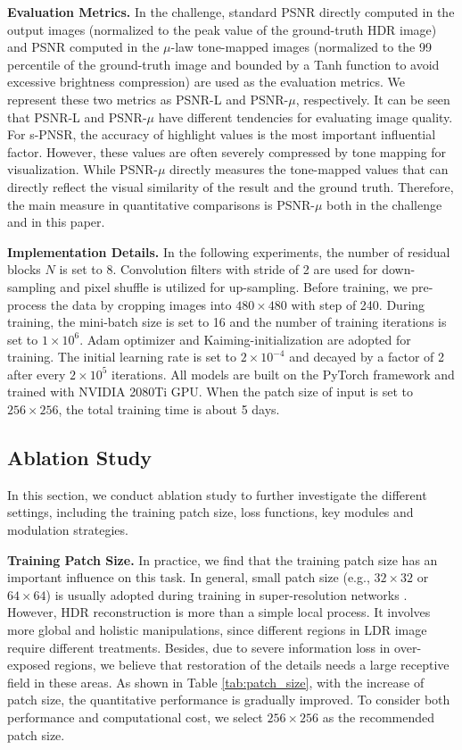 \documentclass[final]{cvpr}
\begin{document}
\textbf{Evaluation Metrics.} In the challenge, standard PSNR directly computed in the output images (normalized to the peak value of the ground-truth HDR image) and PSNR computed in the $\mu$-law tone-mapped images (normalized to the 99 percentile of the ground-truth image and bounded by a Tanh function to avoid excessive brightness compression) are used as the evaluation metrics. We represent these two metrics as PSNR-L and PSNR-$\mu$, respectively. It can be seen that PSNR-L and PSNR-$\mu$ have different tendencies for evaluating image quality. For s-PNSR, the accuracy of highlight values is the most important influential factor. However, these values are often severely compressed by tone mapping for visualization. While PSNR-$\mu$ directly measures the tone-mapped values that can directly reflect the visual similarity of the result and the ground truth. Therefore, the main measure in quantitative comparisons is PSNR-$\mu$ both in the challenge and in this paper.

\textbf{Implementation Details.} In the following experiments, the number of residual blocks $N$ is set to 8. Convolution filters with stride of 2 are used for down-sampling and pixel shuffle \cite{shi2016real} is utilized for up-sampling. Before training, we pre-process the data by cropping images into $480\times 480$ with step of 240. During training, the mini-batch size is set to 16 and the number of training iterations is set to $1\times 10^{6}$. Adam \cite{kingma2014adam} optimizer and Kaiming-initialization \cite{he2015delving} are adopted for training. The initial learning rate is set to $2\times 10^{-4}$ and decayed by a factor of 2 after every $2\times 10^{5}$ iterations. All models are built on the PyTorch framework and trained with NVIDIA 2080Ti GPU. When the patch size of input is set to $256 \times 256$, the total training time is about 5 days.

\subsection{Ablation Study}\label{sec:ablation_study}
In this section, we conduct ablation study to further investigate the different settings, including the training patch size, loss functions, key modules and modulation strategies.

\textbf{Training Patch Size.}
In practice, we find that the training patch size has an important influence on this task. In general,  small patch size (e.g., $32 \times 32$ or $64 \times 64$) is usually adopted during training in super-resolution networks \cite{dong2014learning, wang2019edvr}. However, HDR reconstruction is more than a simple local process. It involves more global and holistic manipulations, since different regions in LDR image require different treatments. Besides, due to severe information loss in over-exposed regions, we believe that restoration of the details needs a large receptive field in these areas. As shown in Table \ref{tab:patch_size}, with the increase of patch size, the quantitative performance is gradually improved. To consider both performance and computational cost, we select $256 \times 256$ as the recommended patch size.
\end{document}
